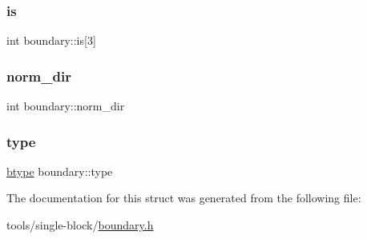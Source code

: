 \mbox{\label{structboundary_acef32353ff57c674cecea5dc6afc0570}} 
\subsubsection{\texorpdfstring{is}{is}}
{\footnotesize\ttfamily int boundary\+::is\mbox{[}3\mbox{]}}

\mbox{\label{structboundary_ac6a7e09c7c4b03819971ff4e7e01ead9}} 
\subsubsection{\texorpdfstring{norm\+\_\+dir}{norm\_dir}}
{\footnotesize\ttfamily int boundary\+::norm\+\_\+dir}

\mbox{\label{structboundary_a382af488872b4d789c1a1c55dc7c941f}} 
\subsubsection{\texorpdfstring{type}{type}}
{\footnotesize\ttfamily \mbox{\hyperlink{boundary_8h_a421e1789e91f264d28c9fb0f244402bc}{btype}} boundary\+::type}



The documentation for this struct was generated from the following file\+:\begin{DoxyCompactItemize}
\item 
tools/single-\/block/\mbox{\hyperlink{boundary_8h}{boundary.\+h}}\end{DoxyCompactItemize}
